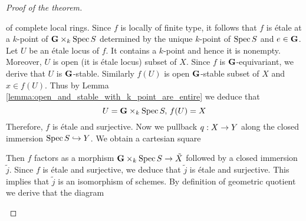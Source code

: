 \begin{proof}[Proof of the theorem]
\begin{center}
\end{center}
of complete local rings. Since $f$ is locally of finite type, it follows that $f$ is {\'e}tale at a $k$-point of $\mathbf{G}\times_k\mathrm{Spec}\, S$ determined by the unique $k$-point of $\mathrm{Spec}\, S$ and $e\in \mathbf{G}$. Let $U$ be an {\'e}tale locus of $f$. It contains a $k$-point and hence it is nonempty. Moreover, $U$ is open (it is {\'e}tale locus) subset of $X$. Since $f$ is $\mathbf{G}$-equivariant, we derive that $U$ is $\mathbf{G}$-stable. Similarly $f(U)$ is open $\mathbf{G}$-stable subset of $X$ and $x \in f(U)$. Thus by Lemma \ref{lemma:open_and_stable_with_k_point_are_entire} we deduce that 
$$U = \mathbf{G}\times_k\mathrm{Spec}\, S,\,f(U) = X$$
Therefore, $f$ is {\'e}tale and surjective. Now we pullback $q:X\rightarrow Y$ along the closed immersion $\mathrm{Spec}\, S\hookrightarrow Y$. We obtain a cartesian square
\begin{center}
\end{center}
Then $f$ factors as a morphism $\mathbf{G}\times_k\mathrm{Spec}\, S\rightarrow \tilde{X}$ followed by a closed immersion $\tilde{j}$. Since $f$ is {\'e}tale and surjective, we deduce that $\tilde{j}$ is {\'e}tale and surjective. This implies that $\tilde{j}$ is an isomorphism of schemes. By definition of geometric quotient we derive that the diagram
\begin{center}

\end{center}
\end{proof}
